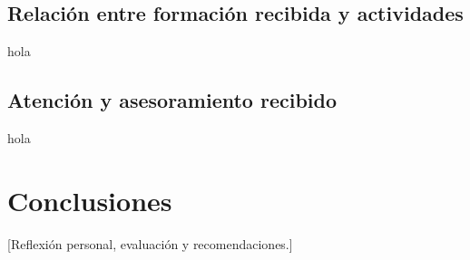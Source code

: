 \section{Relación entre formación recibida y actividades} \label{Relacion entre formacion recibida y actividades}
%
%
hola
%
%
\section{Atención y asesoramiento recibido} \label{Atencion y asesoramiento recibido}
%
%
hola

%
%
\chapter{Conclusiones}
%
%
[Reflexión personal, evaluación y recomendaciones.]
%
%
%
%